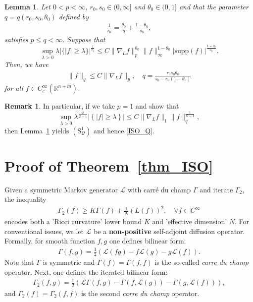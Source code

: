 \documentclass[12pt]{amsart}
\theoremstyle{plain}
\newtheorem{lemma}[theorem]{Lemma}
\theoremstyle{definition}
\newtheorem{remark}[theorem]{Remark}
\numberwithin{equation}{section}
\begin{document}
 
\begin{lemma}\label{le_BCLS}
Let $0<p<\infty$, $r_0,s_0\in (0,\infty]$ and $\theta_0 \in (0,1]$ and that the parameter $q = q(r_0,s_0,\theta_0)$ defined by
\begin{align*}
    \frac{1}{r_0}  = \frac{\theta_0}{q} + \frac{1-\theta_0}{s_0},
\end{align*}
satisfies $p\le q<\infty$. Suppose that
\begin{equation}
    \sup_{\lambda>0} \lambda  \left| \{|f|\ge \lambda\}\right|^{\frac{1}{r_0}}  \le C \|\nabla_L f\|_p^{\theta_0} \|f\|_\infty^{1-\theta_0} |\textrm{supp}(f)|^{\frac{1-\theta_0}{s_0}}.
\end{equation}
Then, we have
\begin{align*}
    \|f\|_q \le C \| \nabla_L f\|_p,\quad q = \frac{r_0 s_0 \theta_0}{s_0 - r_0(1-\theta_0)}
\end{align*}
for all $f\in C_c^\infty(\mathbb{R}^{n+m})$.
\end{lemma}

\begin{remark}
In particular, if we take $p=1$ and show that
\begin{equation}\label{showthis}
\sup_{\lambda>0} \lambda^{\frac{\mathcal{Q}}{\mathcal{Q}-1}}  \left|\left\{ |f| \ge \lambda \right\}\right| \le C \|\nabla_L f\|_1 \|f\|_q^{\frac{1}{\mathcal{Q}-1}},
\end{equation}
then Lemma~\ref{le_BCLS} yields $(\textrm{S}_{\mathcal{Q}}^1)$ and hence \eqref{ISO_Q}.
\end{remark}




\section{Proof of Theorem~\ref{thm_ISO}}

Given a symmetric Markov generator $\mathcal{L}$ with carré du champ $\Gamma$ and iterate $\Gamma_2$, the inequality
\begin{align*}
    \Gamma_2(f) \ge K \Gamma(f) + \frac{1}{N} \left(L(f)\right)^2,\quad \forall f\in C^\infty
\end{align*}
encodes both a 'Ricci curvature' lower bound $K$ and 'effective dimension' $N$. For conventional issues, we let $\mathcal{L}$ be a \textbf{non-positive} self-adjoint diffusion operator. Formally, for smooth function $f,g$ one defines bilinear form:
\begin{align}\label{carre1}
    \Gamma(f,g) = \frac{1}{2} \left( \mathcal{L}(fg) - f \mathcal{L}(g) - g\mathcal{L}(f)\right).
\end{align}
Note that $\Gamma$ is symmetric and $\Gamma(f) = \Gamma(f,f)$ is the so-called \textit{carre du champ} operator. Next, one defines the iterated bilinear form:
\begin{align}\label{carre2}
    \Gamma_2(f,g) = \frac{1}{2} \left( \mathcal{L}\Gamma(f,g) - \Gamma(f,\mathcal{L}(g)) - \Gamma(g,\mathcal{L}(f)) \right),
\end{align}
and $\Gamma_2(f) = \Gamma_2(f,f)$ is the second \textit{carre du champ} operator.
\end{document}
